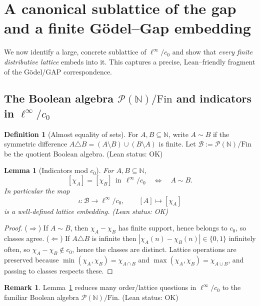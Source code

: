 \documentclass[11pt]{article}
\newtheorem{lemma}[theorem]{Lemma}
\theoremstyle{definition}
\newtheorem{definition}[theorem]{Definition}
\newtheorem{remark}[theorem]{Remark}
\newcommand{\N}{\mathbb{N}}
\newcommand{\linf}{\ell^\infty}
\newcommand{\cnull}{c_0}
\newcommand{\leanok}{\textsf{\small (Lean status: OK)}}
\begin{document}
\section{A canonical sublattice of the gap and a finite Gödel--Gap embedding}
\label{sec:lattice}

We now identify a large, concrete sublattice of $\linf/\cnull$ and show that
\emph{every finite distributive lattice} embeds into it. This captures a precise,
Lean--friendly fragment of the Gödel/GAP correspondence.

\subsection{The Boolean algebra $\mathcal P(\N)/\mathrm{Fin}$ and indicators in $\linf/\cnull$}

\begin{definition}[Almost equality of sets]
For $A,B\subseteq\N$, write $A\sim B$ if the symmetric difference
$A\triangle B=(A\setminus B)\cup(B\setminus A)$ is finite.
Let $\mathcal B:=\mathcal P(\N)/\mathrm{Fin}$ be the quotient Boolean algebra.
\leanok
\end{definition}

\begin{lemma}[Indicators mod $c_0$]\label{lem:indicator-c0}
For $A,B\subseteq\N$,
\[
 [\chi_A]=[\chi_B]\ \ \text{in}\ \ \linf/\cnull
 \quad\Longleftrightarrow\quad
 A\sim B.
\]
In particular the map
\[
 \iota:\mathcal B\longrightarrow \linf/\cnull,\qquad
 [A]\longmapsto [\chi_A]
\]
is a well-defined lattice embedding. \leanok
\end{lemma}

\begin{proof}
($\Rightarrow$) If $A\sim B$, then $\chi_A-\chi_B$ has finite support,
hence belongs to $\cnull$, so classes agree. ($\Leftarrow$) If $A\triangle B$
is infinite then $|\chi_A(n)-\chi_B(n)|\in\{0,1\}$ infinitely often, so
$\chi_A-\chi_B\notin\cnull$, hence the classes are distinct. Lattice operations
are preserved because $\min(\chi_A,\chi_B)=\chi_{A\cap B}$ and
$\max(\chi_A,\chi_B)=\chi_{A\cup B}$, and passing to classes respects these.
\end{proof}

\begin{remark}
Lemma~\ref{lem:indicator-c0} reduces many order/lattice questions in $\linf/\cnull$
to the familiar Boolean algebra $\mathcal P(\N)/\mathrm{Fin}$. \leanok
\end{remark}
\end{document}
